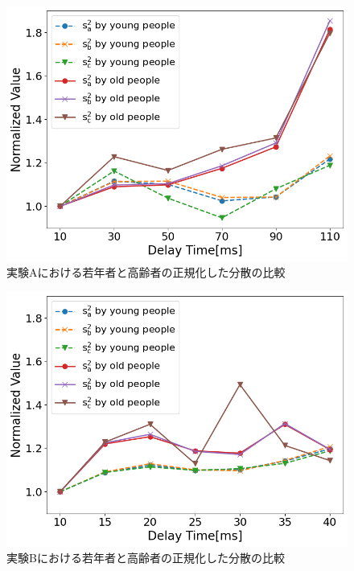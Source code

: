 \begin{figure}[tbp]
  \centering
  \includegraphics[scale=0.5]{figures/Honbann/Comparison_young_old/Normalized-Var_110ms_SaSbSc.png}
  \caption{実験Aにおける若年者と高齢者の正規化した分散の比較}
  \label{fig:Normalized-Var_110ms_SaSbSc}
\end{figure}

\begin{figure}[tbp]
  \centering
  \includegraphics[scale=0.5]{figures/Honbann/Comparison_young_old/Normalized-Var_40ms_SaSbSc.png}
  \caption{実験Bにおける若年者と高齢者の正規化した分散の比較}
  \label{fig:Normalized-Var_40ms_SaSbSc}
\end{figure}


